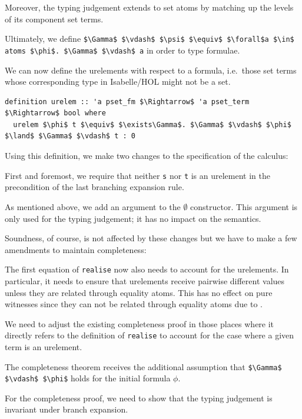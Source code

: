 \documentclass[runningheads]{llncs}
\begin{document}
Moreover, the typing judgement extends to set atoms by matching up the levels of its component set terms.

Ultimately, we define \lstinline!$\Gamma$ $\vdash$ $\psi$ $\equiv$ $\forall$a $\in$ atoms $\phi$. $\Gamma$ $\vdash$ a! in order to type formulae.

We can now define the urelements with respect to a formula, i.e.\ those set terms whose corresponding type in Isabelle/HOL might not be a set.
\begin{lstlisting}
definition urelem :: 'a pset_fm $\Rightarrow$ 'a pset_term $\Rightarrow$ bool where
  urelem $\phi$ t $\equiv$ $\exists\Gamma$. $\Gamma$ $\vdash$ $\phi$ $\land$ $\Gamma$ $\vdash$ t : 0
\end{lstlisting}
Using this definition, we make two changes to the specification of the calculus: 
\begin{enumerate*}[label=(\arabic*)]
  \item First and foremost, we require that neither \lstinline!s! nor \lstinline!t! is an urelement in the precondition of the last branching expansion rule.
  \item As mentioned above, we add an argument to the $\emptyset$ constructor.
    This argument is only used for the typing judgement; it has no impact on the semantics.
\end{enumerate*}

Soundness, of course, is not affected by these changes but we have to make a few amendments to maintain completeness:
\begin{enumerate*}[label=(\arabic*)]
  \item The first equation of \lstinline!realise! now also needs to account for the urelements.
    In particular, it needs to ensure that urelements receive pairwise different values unless they are related through equality atoms. 
    This has no effect on pure witnesses since they can not be related through equality atoms due to .
  \item We need to adjust the existing completeness proof in those places where it directly refers to the definition of \lstinline!realise! to account for the case where a given term is an urelement.
  \item The completeness theorem receives the additional assumption that \lstinline!$\Gamma$ $\vdash$ $\phi$! holds for the initial formula $\phi$. 
  \item For the completeness proof, we need to show that the typing judgement is invariant under branch expansion.
\end{enumerate*}
\end{document}
